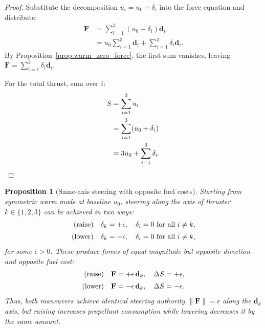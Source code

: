 \documentclass{article}
\newtheorem{proposition}{Proposition}
\begin{document}
\begin{proof}
Substitute the decomposition $u_i = u_0 + \delta_i$ into the force equation and distribute:
\[
\begin{aligned}
\mathbf F 
&= \sum_{i=1}^{3} (u_0 + \delta_i)\mathbf d_i \\
&= u_0 \sum_{i=1}^{3} \mathbf d_i + \sum_{i=1}^{3} \delta_i \mathbf d_i.
\end{aligned}
\]
By Proposition~\ref{prop:warm_zero_force}, the first sum vanishes, leaving 
$\mathbf F = \sum_{i=1}^{3} \delta_i \mathbf d_i$.

For the total thrust, sum over $i$:
\[
\begin{aligned}
S &= \sum_{i=1}^{3} u_i \\
  &= \sum_{i=1}^{3} (u_0 + \delta_i) \\
  &= 3u_0 + \sum_{i=1}^{3} \delta_i. \qedhere
\end{aligned}
\]
\end{proof}


\begin{proposition}[Same-axis steering with opposite fuel costs]
\label{prop:lower_vs_raise}
Starting from symmetric warm mode at baseline $u_0$, steering along the axis of thruster 
$k \in \{1,2,3\}$ can be achieved in two ways:
\[
\begin{aligned}
\textup{(raise)} &\quad \delta_k = +\epsilon, \quad \delta_i = 0 \ \text{for all } i \neq k, \\[2pt]
\textup{(lower)} &\quad \delta_k = -\epsilon, \quad \delta_i = 0 \ \text{for all } i \neq k,
\end{aligned}
\]
for some $\epsilon > 0$. These produce forces of equal magnitude but opposite direction and 
opposite fuel cost:
\[
\begin{aligned}
\textup{(raise)} &\quad \mathbf F = +\epsilon\,\mathbf d_k, \quad \Delta S = +\epsilon, \\[2pt]
\textup{(lower)} &\quad \mathbf F = -\epsilon\,\mathbf d_k, \quad \Delta S = -\epsilon.
\end{aligned}
\]
Thus, both maneuvers achieve identical steering authority $\|\mathbf F\| = \epsilon$ along the 
$\mathbf d_k$ axis, but raising increases propellant consumption while lowering decreases it 
by the same amount.
\end{proposition}
\end{document}
